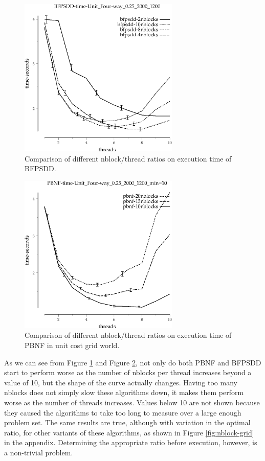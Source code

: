 \documentclass{article}
\begin{document}
\begin{figure}[h!]
\includegraphics[width=3in]{../graphs/grid_unit_four-way_0.25_2000_1200/BFPSDD-time-Unit_Four-way_0.25_2000_1200.eps}
\caption{Comparison of different nblock/thread ratios on execution time of BFPSDD.}
\label{fig:BFPSDD-nblock-grid}
\end{figure}

\begin{figure}[h!]
\includegraphics[width=3in]{../graphs/grid_unit_four-way_0.25_2000_1200/PBNF-time-Unit_Four-way_0.25_2000_1200_min=10.eps}
\caption{Comparison of different nblock/thread ratios on execution time of PBNF in unit cost grid world.}
\label{fig:PBNF-nblock-grid}
\end{figure}

As we can see from Figure \ref{fig:BFPSDD-nblock-grid} and Figure \ref{fig:PBNF-nblock-grid}, not only do both PBNF and BFPSDD start to perform worse as the number of nblocks per thread increases beyond a value of 10, but the shape of the curve actually changes. Having too many nblocks does not simply slow these algorithms down, it makes them perform worse as the number of threads increases. Values below 10 are not shown because they caused the algorithms to take too long to measure over a large enough problem set. The same results are true, although with variation in the optimal ratio, for other variants of these algorithms, as shown in Figure \ref{fig:nblock-grid} in the appendix. Determining the appropriate ratio before execution, however, is a non-trivial problem.
\end{document}
